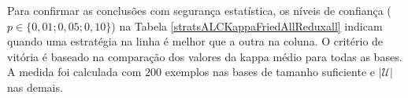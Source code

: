 Para confirmar as conclusões com segurança estatística, os níveis de confiança
($p \in \{0,01; 0,05; 0,10\}$) na Tabela \ref{stratsALCKappaFriedAllReduxall} indicam
quando uma estratégia na linha é melhor que a outra na coluna.
O critério de vitória é baseado na comparação dos valores da kappa médio para todas as bases.
A medida foi calculada com $200$ exemplos nas bases de tamanho suficiente
e $|\mathcal{U}|$ nas demais.
% 
\begin{table}[h]
\caption{Um contra um para as estratégias (564 testes).
Medida: kappa médio. \textit{Legenda na Tabela \ref{tab:friedClassif}.}}

\begin{center}
\quad
{}
\end{center}
\end{table}
